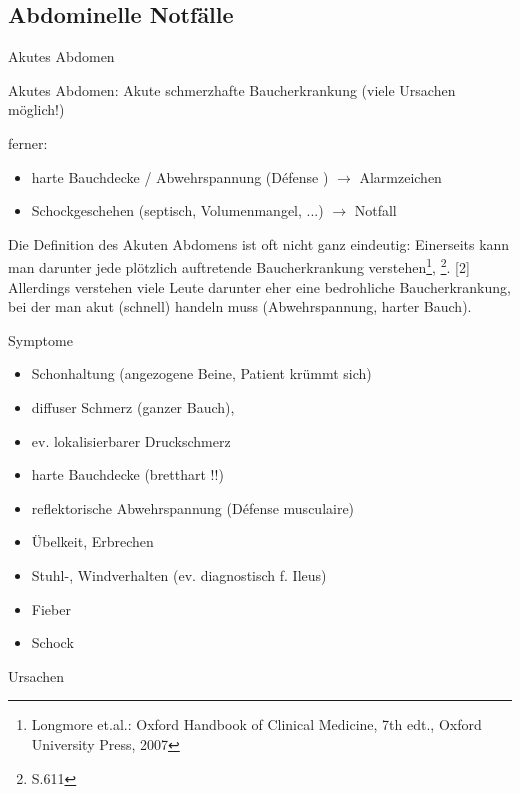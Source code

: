 \documentclass{article}
\begin{document}
\subsection{Abdominelle Notf\"alle}
Akutes Abdomen

Akutes Abdomen: Akute schmerzhafte Baucherkrankung (viele Ursachen 
m\"oglich!)

ferner: 

\begin{itemize}
\item harte Bauchdecke / Abwehrspannung  (D\'efense ) ${\rightarrow}$
Alarmzeichen

\item Schockgeschehen (septisch,  Volumenmangel, ...) ${\rightarrow}$
Notfall

\end{itemize}
Die Definition des Akuten Abdomens ist oft nicht ganz eindeutig:
Einerseits kann man da\-runter jede pl\"otzlich auftretende
Baucherkrankung verstehen\footnote{Longmore et.al.: Oxford Handbook of
Clinical Medicine, 7th edt., Oxford University Press, 2007},
\footnote{\cite{BLIM03} S.611}. \label{ref:JRcite1OHCM7}[2] Allerdings
ver\-stehen viele Leute darunter eher eine bedrohliche
Bauch\-erkrankung, bei der man akut (schnell) handeln muss
(Ab\-wehrspannung, harter Bauch).

Symptome

\begin{itemize}
\item Schonhaltung  (angezogene Beine, Patient  kr\"ummt sich)

\item diffuser Schmerz (ganzer Bauch), 

\item ev. lokalisierbarer Druckschmerz

\item harte  Bauchdecke (bretthart !!)

\item reflektorische Abwehrspannung  (D\'efense musculaire)

\item \"Ubelkeit, Erbrechen

\item Stuhl-, Windverhalten (ev. diagnostisch f.  Ileus) 

\item Fieber

\item Schock

\end{itemize}
Ursachen
\end{document}
